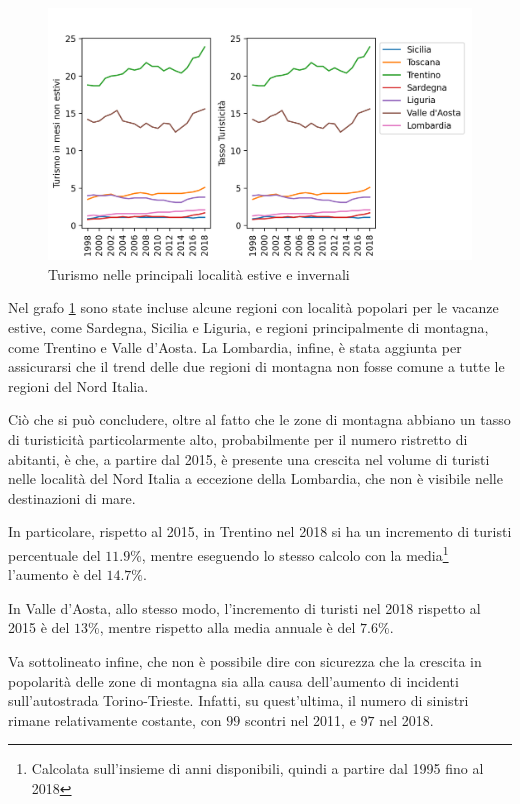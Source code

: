 \documentclass[a4paper,12pt]{report}
\begin{document}
\begin{figure}
    \includegraphics[width=\linewidth]{../src/turismo/turismo.png}
    \caption{Turismo nelle principali località estive e invernali}
    \label{fig:turismo}
\end{figure}

Nel grafo \ref{fig:turismo} sono state incluse alcune regioni con località popolari 
per le vacanze estive, come Sardegna, Sicilia e Liguria, e regioni principalmente 
di montagna, come Trentino e Valle d'Aosta. 
La Lombardia, infine, è stata aggiunta per assicurarsi che il trend delle due regioni 
di montagna non fosse comune a tutte le regioni del Nord Italia.

Ciò che si può concludere, oltre al fatto che le zone di montagna abbiano 
un tasso di turisticità particolarmente alto, probabilmente per il numero 
ristretto di abitanti, 
è che, a partire dal 2015, è presente una crescita nel volume di turisti nelle località 
del Nord Italia a eccezione della Lombardia, che non è visibile nelle 
destinazioni di mare.

In particolare, rispetto al 2015, in Trentino nel 2018 si ha un incremento 
di turisti percentuale del $11.9$\%, mentre eseguendo lo stesso calcolo con la 
media\footnote{Calcolata sull'insieme di anni disponibili, quindi 
a partire dal 1995 fino al 2018} l'aumento è del $14.7$\%.

In Valle d'Aosta, allo stesso modo, l'incremento di turisti nel 2018 
rispetto al 2015 è del $13$\%, mentre rispetto alla media annuale 
è del $7.6$\%.

Va sottolineato infine, che non è possibile dire con sicurezza che 
la crescita in popolarità delle zone di montagna sia alla causa dell'aumento 
di incidenti sull'autostrada Torino-Trieste. 
Infatti, su quest'ultima, il numero di sinistri rimane relativamente costante, 
con $99$ scontri nel 2011, e $97$ nel 2018.
\end{document}
